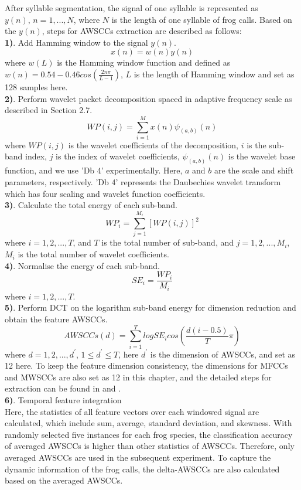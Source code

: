 After syllable segmentation, the signal of one syllable is represented as 
$y(n),\,n = 1,...,N$, where $N$ is the length of one syllable of frog calls. Based on the $y(n)$, steps for AWSCCs extraction are described as follows:\\
\textbf{1)}. Add Hamming window to the signal $y(n)$.
\begin{equation}
x(n) = w(n)y(n)
\end{equation}
\noindent where $w(L)$ is the Hamming window function and defined as $w(n)=0.54-0.46cos(\frac{2n\pi}{L-1}) $, $L$ is the length of Hamming window and set as 128 samples here.
\\
\textbf{2)}. Perform wavelet packet decomposition spaced in adaptive frequency scale as described in Section 2.7.
\begin{equation}
WP(i,j)=\sum_{i=1}^{M}x(n)\psi_{(a,b)}(n) 
\end{equation}
\noindent where $WP(i,j)$ is the wavelet coefficients of the decomposition, $i$ is the sub-band index, $j$ is the index of wavelet coefficients, $\psi_{(a,b)}(n)$ is the wavelet base function, and we use 'Db 4' experimentally. Here, $a$ and $b$ are the scale and shift parameters, respectively. 'Db 4' represents the Daubechies wavelet transform which has four scaling and wavelet function coefficients.
\\
\textbf{3)}. Calculate the total energy of each sub-band.
\begin{equation}
WP_{i}=\sum_{j=1}^{M_{i}}[WP(i,j)]^2
\end{equation}
\noindent where $i=1,2,...,T$, and $T$ is the total number of sub-band, and $j=1,2,...,M_{i}$, $M_{i}$ is the total number of wavelet coefficients.
\\
\textbf{4)}. Normalise the energy of each sub-band.
\begin{equation}
SE_{i}=\frac{WP_{i}}{M_{i}}
\end{equation}
\noindent where $i=1,2,...,T$.
\\
\textbf{5)}. Perform DCT on the logarithm sub-band energy for dimension reduction and obtain the feature AWSCCs.
\begin{equation}
AWSCCs(d)=\sum_{i=1}^{T}logSE_{i}cos(\frac{d(i-0.5)}{T}\pi)
\end{equation}
\noindent where $d=1,2,...,d^{'}$, $1 \leq d^{'} \leq T$, here $d^{'}$ is the dimension of AWSCCs, and set as 12 here. To keep the feature dimension consistency, the dimensions for MFCCs and MWSCCs are also set as 12 in this chapter, and the detailed steps for extraction can be found in \citep{bedoya2014automatic} and \citep{Zhang2015108}.
\\
\textbf{6)}. Temporal feature integration
\\
Here, the statistics of all feature vectors over each windowed signal are calculated, which include sum, average, standard deviation, and skewness. With randomly selected five instances for each frog species, the classification accuracy of averaged AWSCCs is higher than other statistics of AWSCCs. Therefore, only averaged AWSCCs are used in the subsequent experiment. To capture the dynamic information of the frog calls, the delta-AWSCCs are also calculated based on the averaged AWSCCs. 




